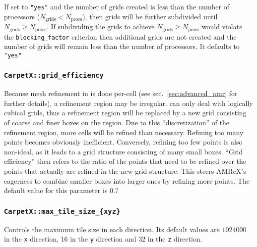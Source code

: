 If set to \texttt{"yes"} and the number of grids created is less than the number of processors ($N_\text{grids} < N_\text{procs}$), then grids will be further subdivided until $N_\text{grids} \geq N_\text{procs}$. If subdividing the grids to achieve $N_\text{grids} \geq N_\text{procs}$ would violate the \texttt{blocking\_factor} criterion then additional grids are not created and the number of grids will remain less than the number of processors. It defaults to \texttt{"yes"}

\subsubsection{\texttt{CarpetX::grid\_efficiency}}

Because mesh refinement in \AMReX is done per-cell (see sec.~\ref{sec:advanced_amr} for further details), a refinement region may be irregular. \AMReX\space can only deal with logically cubical grids, thus a refinement region will be replaced by a new grid consisting of coarse and finer boxes on the region. Due to this ``discretization'' of the refinement region, more cells will be refined than necessary. Refining too many points becomes obviously inefficient. Conversely, refining too few points is also non-ideal, as it leads to a grid structure consisting of many small boxes. ``Grid efficiency'' then refers to the ratio of the points that need to be refined over the points that actually are refined in the new grid structure. This steers AMReX's eagerness to combine smaller boxes into larger ones by refining more points. The default value for this parameter is $0.7$

\subsubsection{\texttt{CarpetX::max\_tile\_size\_\{xyz\}}}

Controls the maximum tile size in each direction. Its default values are $1024000$ in the \texttt{x} direction, $16$ in the \texttt{y} direction and $32$ in the \texttt{z} direction.
